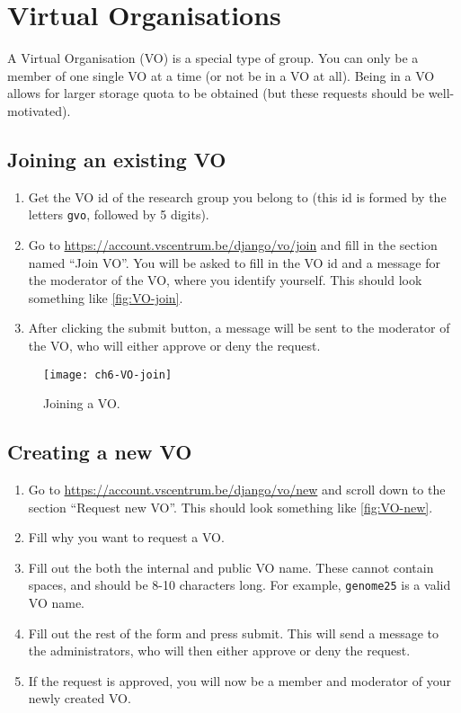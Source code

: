 \ifgent
\section{Virtual Organisations}
\label{sec:virtual-organisations}

A Virtual Organisation (VO) is a special type of group. You can only be a member
of one single VO at a time (or not be in a VO at all).
Being in a VO allows for larger storage quota to be obtained
(but these requests should be well-motivated).

\subsection{Joining an existing VO}

\begin{enumerate}
    \item Get the VO id of the research group you belong to (this id is formed by
        the letters \lstinline|gvo|, followed by 5 digits).
    \item Go to \url{https://account.vscentrum.be/django/vo/join} and fill in the
        section named ``Join VO''. You will be asked to fill in the VO id and a message for
        the moderator of the VO, where you identify yourself. This should look something
        like \autoref{fig:VO-join}.
    \item After clicking the submit button, a message will be sent to the moderator
    of the VO, who will either approve or deny the request.
\end{enumerate}



\begin{figure}[!htbp]
  \caption{Joining a VO.}
  \centering
    \texttt{[image: ch6-VO-join]}
\end{figure}\label{fig:VO-join}

\subsection{Creating a new VO}

\begin{enumerate}
    \item Go to \url{https://account.vscentrum.be/django/vo/new} and scroll down
        to the section ``Request new VO''. This should look something like
        \autoref{fig:VO-new}.
    \item Fill why you want to request a VO.
    \item Fill out the both the internal and public VO name. These cannot contain
        spaces, and should be 8-10 characters long. For example, \lstinline|genome25| is
        a valid VO name.
    \item Fill out the rest of the form and press submit. This will send a message
        to the \hpc administrators, who will then either approve or deny the request.
    \item If the request is approved, you will now be a member and moderator of your
        newly created VO.
\end{enumerate}


